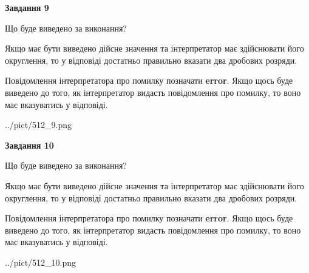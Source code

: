 \documentclass[12pt, ukrainian]{article}
\begin{document}
{\begin {Large}
{\begin {center}\textbf{Завдання 9}\end {center}}\par
Що буде виведено за виконання? \par

Якщо має бути виведено дійсне значення та інтерпретатор має здійснювати його округлення, 
то у відповіді достатньо правильно вказати два дробових розряди.

Повідомлення інтерпретатора про помилку позначати \textbf{error}.
Якщо щось буде виведено до того, як інтерпретатор видасть повідомлення про помилку, 
то воно має вказуватись у відповіді. \par

\begin{center}
	{../pict/512_9.png}
\end{center}
\newpage

{\begin {center}\textbf{Завдання 10}\end {center}}\par
Що буде виведено за виконання? \par

Якщо має бути виведено дійсне значення та інтерпретатор має здійснювати його округлення, 
то у відповіді достатньо правильно вказати два дробових розряди.

Повідомлення інтерпретатора про помилку позначати \textbf{error}.
Якщо щось буде виведено до того, як інтерпретатор видасть повідомлення про помилку, 
то воно має вказуватись у відповіді. \par

\begin{center}
	{../pict/512_10.png}
\end{center}
\newpage

\end {Large}}
\end{document}

